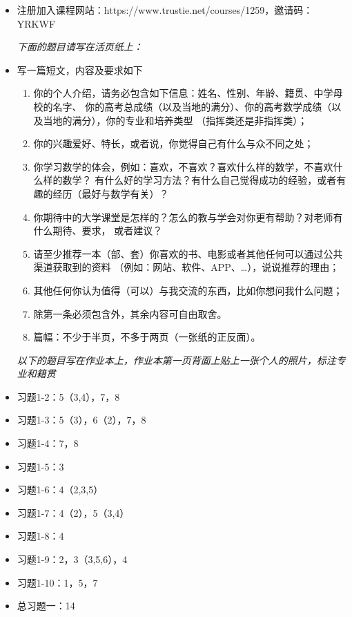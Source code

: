 \begin{itemize}
  \item 注册加入课程网站：https://www.trustie.net/courses/1259，邀请码：YRKWF
  
  {\b\it 下面的题目请写在活页纸上：}
  \item 写一篇短文，内容及要求如下
  \begin{enumerate}[(1)]
    \item 你的个人介绍，请务必包含如下信息：姓名、性别、年龄、籍贯、中学母校的名字、
    你的高考总成绩（以及当地的满分）、你的高考数学成绩（以及当地的满分），你的专业和培养类型
    （指挥类还是非指挥类）；
    \item 你的兴趣爱好、特长，或者说，你觉得自己有什么与众不同之处；
    \item 你学习数学的体会，例如：喜欢，不喜欢？喜欢什么样的数学，不喜欢什么样的数学？
    有什么好的学习方法？有什么自己觉得成功的经验，或者有趣的经历（最好与数学有关）？
    \item 你期待中的大学课堂是怎样的？怎么的教与学会对你更有帮助？对老师有什么期待、要求，
    或者建议？
    \item 请至少推荐一本（部、套）你喜欢的书、电影或者其他任何可以通过公共渠道获取到的资料
    （例如：网站、软件、APP、\ldots），说说推荐的理由；
    \item 其他任何你认为值得（可以）与我交流的东西，比如你想问我什么问题；
    \item 除第一条必须包含外，其余内容可自由取舍。
    \item 篇幅：不少于半页，不多于两页（一张纸的正反面）。
  \end{enumerate}
  {\b\it 以下的题目写在作业本上，作业本第一页背面上贴上一张个人的照片，标注专业和籍贯}
  \item 习题1-2：5（3,4），7，8
  \item 习题1-3：5（3），6（2），7，8
  \item 习题1-4：7，8
  \item 习题1-5：3
  \item 习题1-6：4（2,3,5）
  \item 习题1-7：4（2），5（3,4）
  \item 习题1-8：4
  \item 习题1-9：2，3（3,5,6），4
  \item 习题1-10：1，5，7
  \item 总习题一：14
\end{itemize}

% 
% 
% 
% 

